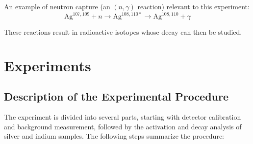 \documentclass[12pt,a4paper]{article}
\begin{document}
An example of neutron capture (an $(n,\gamma)$ reaction) relevant to this experiment:
\[
\mathrm{Ag}^{107,109} + n \rightarrow \mathrm{Ag}^{108,110*} \rightarrow \mathrm{Ag}^{108,110} + \gamma
\]

These reactions result in radioactive isotopes whose decay can then be studied.







\section{Experiments}

\subsection{Description of the Experimental Procedure}

The experiment is divided into several parts, starting with detector calibration and background measurement, followed by the activation and decay analysis of silver and indium samples. The following steps summarize the procedure:
\end{document}
